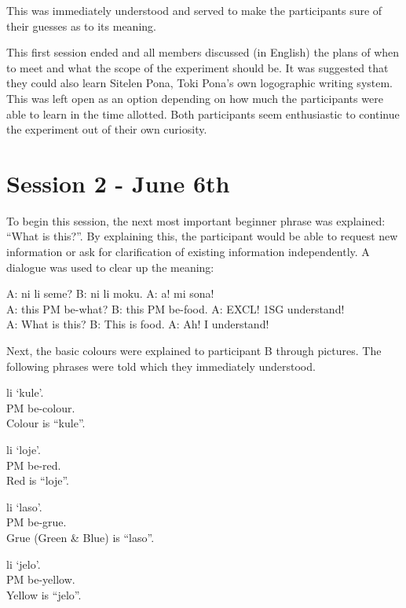 \documentclass[a4paper,10pt]{article}
\begin{document}
This was immediately understood and served to make the participants sure of
their guesses as to its meaning.

This first session ended and all members discussed (in English) the plans
of when to meet and what the scope of the experiment should be. It was suggested that they could
also learn Sitelen Pona, Toki Pona's own logographic writing system. This
was left open as an option depending on how much the participants were able
to learn in the time allotted. Both participants seem enthusiastic to
continue the experiment out of their own curiosity.


\section{Session 2 - June 6th}

To begin this session, the next most important beginner phrase was
explained: ``What is this?''. By explaining this, the participant would
be able to request new information or ask for clarification of existing
information independently. A dialogue was used to clear up the meaning:

\begin{exe}
 \ex
 \gll A: ni li seme? B: ni li moku. A: a! mi sona! \\
 A: this PM be-what? B: this PM be-food. A: EXCL! 1SG understand! \\
 \glt A: What is this? B: This is food. A: Ah! I understand!
\end{exe}

Next, the basic colours were explained to participant B
through pictures. The following phrases were told which they immediately
understood.

\begin{exe}
 \ex
  li `kule'. \\
 [Image of colour spectrum; Colour] PM be-colour.\\
 \glt Colour is ``kule''.
\end{exe}
\begin{exe}
 \ex
  li `loje'. \\
 [Red Circle; Red] PM be-red.\\
 \glt Red is ``loje''.
\end{exe}
\begin{exe}
 \ex
  li `laso'. \\
 [Green and Blue Circle; Grue] PM be-grue.\\
 \glt Grue (Green \& Blue) is ``laso''.
\end{exe}
\begin{exe}
 \ex
  li `jelo'. \\
 [Yellow Circle; Yellow] PM be-yellow.\\
 \glt Yellow is ``jelo''.
\end{exe}
\end{document}
